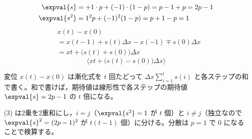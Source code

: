 \begin{align*}
  \expval{s}&=+1\cdot p+(-1)\cdot(1-p)=p-1+p=2p-1\\
  \expval{s^{2}}&=1^{2}p+(-1)^{2}(1-p)=p+1-p=1
\end{align*}
\begin{align*}
  &x(t)-x(0)\\
  &=x(t-1)+s(t)\Delta x-x(-1)\mp s(0)\Delta x\\
  &=xt+\bigl(s(t)+s(0)\bigr)\Delta x
\end{align*}
\[ \bigl\langle xt+\bigl(s(t)-s(0)\bigr)\Delta x\bigr\rangle \]
\mikai
{}
\mikai
{}
\mikai
\item 変位 $x(t)-x(0)$ は漸化式を $t$ 回たどって $\Delta x\sum_{i=1}^{t}s(i)$ と各ステップの和で書く。和で書けば，期待値は線形性で各ステップの期待値 $\expval{s}=2p-1$ の $t$ 倍になる。
\item (3) は2乗を2重和にし，$i=j$（$\expval{s^{2}}=1$ が $t$ 個）と $i\neq j$（独立なので $\expval{s}^{2}=(2p-1)^{2}$ が $t(t-1)$ 個）に分ける。分散は $p=1$ で 0 になることで検算する。
